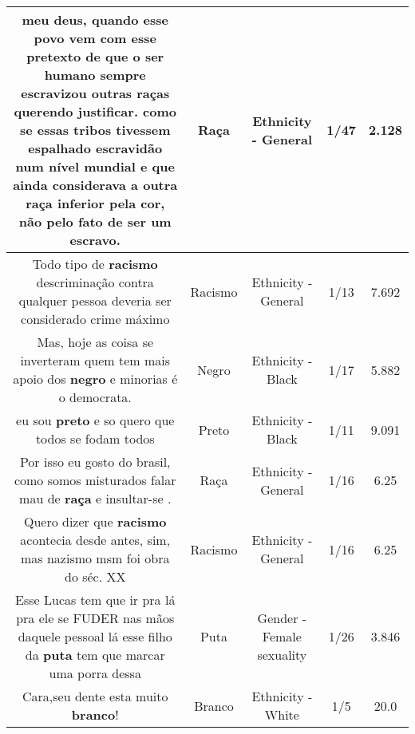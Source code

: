 \documentclass[11pt]{article}
\newlength\mylength
\begin{document}
\begin{center}
\begin{longtable}{|C{.65\mylength}|C{.30\mylength}|C{.12\mylength}|C{.12\mylength}|C{.12\mylength}|}
  \small meu deus, quando esse povo vem com esse pretexto de que o ser humano sempre escravizou outras raças querendo justificar. como se essas tribos tivessem espalhado escravidão  num nível mundial e que ainda considerava a outra \textbf{raça} inferior pela cor, não pelo fato de ser um escravo.\normalsize   & Raça & Ethnicity - General & 1/47 & 2.128 \\  \hline
  \small Todo tipo de \textbf{racismo} descriminação contra qualquer pessoa deveria ser considerado crime máximo\normalsize   & Racismo & Ethnicity - General & 1/13 & 7.692 \\  \hline
  \small Mas, hoje as coisa se inverteram quem tem mais apoio dos \textbf{negro} e minorias é o democrata.\normalsize   & Negro & Ethnicity - Black & 1/17 & 5.882 \\  \hline
  \small eu sou \textbf{preto} e so quero que todos se fodam todos\normalsize   & Preto & Ethnicity - Black & 1/11 & 9.091 \\  \hline
  \small Por isso eu gosto do brasil, como somos misturados falar mau de \textbf{raça} e insultar-se .\normalsize   & Raça & Ethnicity - General & 1/16 & 6.25 \\  \hline
  \small Quero dizer que \textbf{racismo} acontecia desde antes, sim, mas nazismo msm foi obra do séc. XX\normalsize   & Racismo & Ethnicity - General & 1/16 & 6.25 \\  \hline
  \small Esse Lucas tem que ir pra lá pra ele se FUDER nas mãos daquele pessoal lá esse filho da \textbf{puta} tem que marcar uma porra dessa\normalsize   & Puta & Gender - Female sexuality & 1/26 & 3.846 \\  \hline
  \small Cara,seu dente esta muito \textbf{branco}!\normalsize   & Branco & Ethnicity - White & 1/5 & 20.0 \\  \hline

\end{longtable}
\end{center}
\end{document}
